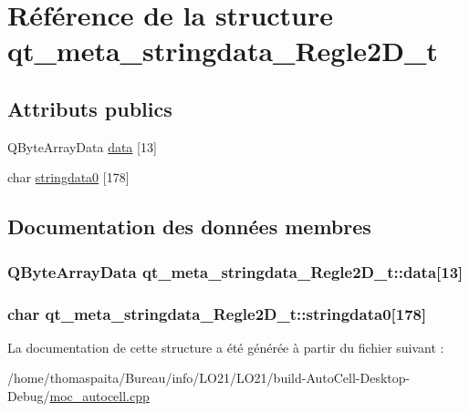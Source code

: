 \hypertarget{structqt__meta__stringdata___regle2_d__t}{}\section{Référence de la structure qt\+\_\+meta\+\_\+stringdata\+\_\+\+Regle2\+D\+\_\+t}
\label{structqt__meta__stringdata___regle2_d__t}
\subsection*{Attributs publics}
\begin{DoxyCompactItemize}
\item 
Q\+Byte\+Array\+Data \hyperlink{structqt__meta__stringdata___regle2_d__t_af5da57dd8257a53d5fa5ae25ba15d12c}{data} \mbox{[}13\mbox{]}
\item 
char \hyperlink{structqt__meta__stringdata___regle2_d__t_aa969665748e3c27f0a24557b6d8d3ec5}{stringdata0} \mbox{[}178\mbox{]}
\end{DoxyCompactItemize}


\subsection{Documentation des données membres}
\subsubsection[{\texorpdfstring{data}{data}}]{\setlength{\rightskip}{0pt plus 5cm}Q\+Byte\+Array\+Data qt\+\_\+meta\+\_\+stringdata\+\_\+\+Regle2\+D\+\_\+t\+::data\mbox{[}13\mbox{]}}\hypertarget{structqt__meta__stringdata___regle2_d__t_af5da57dd8257a53d5fa5ae25ba15d12c}{}\label{structqt__meta__stringdata___regle2_d__t_af5da57dd8257a53d5fa5ae25ba15d12c}
\subsubsection[{\texorpdfstring{stringdata0}{stringdata0}}]{\setlength{\rightskip}{0pt plus 5cm}char qt\+\_\+meta\+\_\+stringdata\+\_\+\+Regle2\+D\+\_\+t\+::stringdata0\mbox{[}178\mbox{]}}\hypertarget{structqt__meta__stringdata___regle2_d__t_aa969665748e3c27f0a24557b6d8d3ec5}{}\label{structqt__meta__stringdata___regle2_d__t_aa969665748e3c27f0a24557b6d8d3ec5}


La documentation de cette structure a été générée à partir du fichier suivant \+:\begin{DoxyCompactItemize}
\item 
/home/thomaspaita/\+Bureau/info/\+L\+O21/\+L\+O21/build-\/\+Auto\+Cell-\/\+Desktop-\/\+Debug/\hyperlink{moc__autocell_8cpp}{moc\+\_\+autocell.\+cpp}\end{DoxyCompactItemize}
